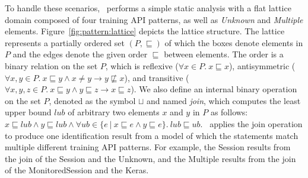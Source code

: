 To handle these scenarios, \tapi~performs a simple static analysis with a flat
lattice domain composed of four training API patterns, as well as {\it Unknown}
and {\it Multiple} elements. 
Figure~\ref{fig:pattern:lattice} depicts the lattice structure.  
The lattice represents a partially ordered set $(P, \sqsubseteq)$ of which the
boxes denote elements in $P$ and the edges denote the given order $\sqsubseteq$
between elements.
The order is a binary relation on the set $P$, which is reflexive ($\forall x
\in P.\ x \sqsubseteq x$), antisymmetric ($\forall x, y \in P.\ x \sqsubseteq y
\wedge x \not= y \to y \not\sqsubseteq x$), and transitive ($\forall x, y, z
\in P.\ x \sqsubseteq y \wedge y \sqsubseteq z \to x \sqsubseteq z$). 
We also define an internal binary operation on the set $P$, denoted as the
symbol $\sqcup$ and named {\it join}, which computes the least upper bound
$lub$ of arbitrary two elements $x$ and $y$ in $P$ as follows: $x \sqsubseteq
lub \wedge y \sqsubseteq lub \wedge \forall ub \in \{e\ |\ x \sqsubseteq e
\wedge y \sqsubseteq e\}.\ lub \sqsubseteq ub$. 
\tapi~applies the join operation to produce one identification result from a
model of which the statements match multiple different training API patterns.
For example, the Session results from the join of the Session and the Unknown,
and the Multiple results from the join of the MonitoredSession and the Keras.

